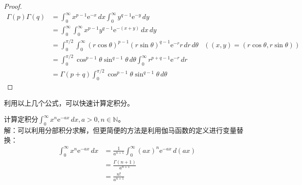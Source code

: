 \documentclass{ctexbook}
\begin{document}
\begin{proof}
    \begin{align*}
    \Gamma (p)\Gamma (q)&=\int_{0}^{\infty}x^{p-1}\mathrm{e}^{-x}\,dx\int_{0}^{\infty}y^{q-1}\mathrm{e}^{-y}\,dy\\
    &=\int_{0}^{\infty}\int_{0}^{\infty}x^{p-1}y^{q-1}\mathrm{e}^{-(x+y)}\,dx\,dy\\
    &=\int_{0}^{\pi/2}\int_{0}^{\infty}(r\cos\theta)^{p-1}(r\sin\theta)^{q-1}\mathrm{e}^{-r}r\,dr\,d\theta&\left((x,y)=(r\cos\theta,r\sin\theta)\right)\\
    &=\int_{0}^{\pi/2}\cos^{p-1}\theta\sin^{q-1}\theta\,d\theta\int_{0}^{\infty}r^{p+q-1}\mathrm{e}^{-r}\,dr\\
    &=\Gamma (p+q)\int_{0}^{\pi/2}\cos^{p-1}\theta\sin^{q-1}\theta\,d\theta
    \end{align*}
\end{proof}

利用以上几个公式，可以快速计算定积分。

\begin{example}[伽马函数的变形]
    计算定积分$\int_{0}^{\infty}x^{n}\mathrm{e}^{-ax}\,dx,a>0,n\in\mathbb{N}$。\\
解：可以利用分部积分求解，但更简便的方法是利用伽马函数的定义进行变量替换：
    \begin{align*}
        \int_{0}^{\infty}x^{n}\mathrm{e}^{-ax}\,dx&=\frac{1}{a^{n+1}}\int_{0}^{\infty}(ax)^{n}\mathrm{e}^{-ax}\,d(ax)\\
        &=\frac{\Gamma (n+1)}{a^{n+1}}\\
        &=\frac{n!}{a^{n+1}}
    \end{align*}
\end{example}

\end{document}
